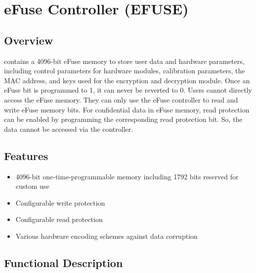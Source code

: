 \documentclass[main\_\_EN.tex]{subfiles}
\begin{document}

\ifglobal
\else
    {\let\clearpage\relax \listoftodos}
    {\let\clearpage\relax \listofdonetodos}
    \tableofcontents
\fi



\hypertarget{efuse}{}
\chapter{eFuse Controller (EFUSE)}
\label{mod:efuse}

\section{Overview}

\chipname{} contains a 4096-bit eFuse memory to store user data and hardware parameters, including control parameters for hardware modules, calibration parameters, the MAC address, and keys used for the encryption and decryption module. Once an eFuse bit is programmed to 1, it can never be reverted to 0. Users cannot directly access the eFuse memory. They can only use the eFuse controller to read and write eFuse memory bits. For confidential data in eFuse memory, read protection can be enabled by programming the corresponding read protection bit. So, the data cannot be accessed via the controller.


\section{Features}

\begin{itemize}
    \item 4096-bit one-time-programmable memory including 1792 bits reserved for custom use
    \item Configurable write protection
    \item Configurable read protection
    \item Various hardware encoding schemes against data corruption
\end{itemize}


\section{Functional Description}
\end{document}
